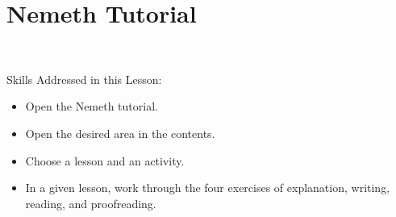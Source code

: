 \documentclass[10pt,letterpaper,twoside]{report}
\begin{document}
{{{%
\clearpage


\section{ Nemeth Tutorial}
\

Skills Addressed in this Lesson:
\begin{itemize}
	\item Open the Nemeth tutorial.
	\item Open the desired area in the contents.
	\item Choose a lesson and an activity.
	\item In a given lesson, work through the four exercises of explanation, writing, reading, and proofreading.
\end{itemize}
}}}
\end{document}
